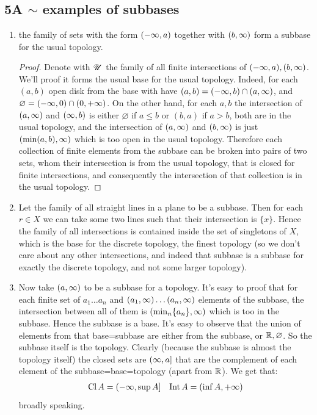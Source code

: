 \documentclass[a4paper]{article}
\newcommand\nsubsection[1]{\subsection*{#1}\addcontentsline{toc}{subsection}{#1}}
\begin{document}
	\section[Bases and Subbases]{}
	\nsubsection{5A $\sim$ examples of subbases}
	\begin{enumerate}
		\item the family of sets with the form $(-\infty, a)$ together with $(b, \infty)$ form a subbase for the usual topology. 
		\begin{proof}
			Denote with $\mathscr{U}$ the family of all finite intersections of $(-\infty, a), (b, \infty)$. We'll proof it forms the usual base for the usual topology. Indeed, for each $(a, b)$ open disk from the base with have $(a, b) = (-\infty, b) \cap (a, \infty)$, and $\varnothing = (-\infty, 0) \cap (0, + \infty)$. On the other hand, for each $a, b$ the intersection of $(a, \infty)$ and $(\infty, b)$ is either $\varnothing$ if $a \le b$ or $(b, a)$ if $a > b$, both are in the usual topology, and the intersection of $(a, \infty)$ and $(b, \infty)$ is just $(\min(a, b), \infty)$ which is too open in the usual topology. Therefore each collection of finite elements from the subbase can be broken into pairs of two sets, whom their intersection is from the usual topology, that is closed for finite intersections, and consequently the intersection of that collection is in the usual topology.  
		\end{proof}
		\item Let the family of all straight lines in a plane to be a subbase. Then for each $r \in X$ we can take some two lines such that their intersection is $\{x\}$. Hence the family of all intersections is contained inside the set of singletons of $X$, which is the base for the discrete topology, the finest topology (so we don't care about any other intersections, and indeed that subbase is a subbase for exactly the discrete topology, and not some larger topology). 
		\item Now take $(a, \infty)$ to be a subbase for a topology. It's easy to proof that for each finite set of $a_1 \dots a_n$ and $(a_1, \infty) \dots (a_n, \infty)$ elements of the subbase, the intersection between all of them is $(\min_n\{a_n\}, \infty)$ which is too in the subbase. Hence the subbase is a base. It's easy to observe that the union of elements from that base=subbase are either from the subbase, or $\mathbb{R}, \varnothing$. So the subbase itself is the topology. Clearly (because the subbase is almost the topology itself) the closed sets are $(\infty, a]$ that are the complement of each element of the subbase=base=topology (apart from $\mathbb{R}$). We get that: 
		\begin{align*}
			\operatorname{Cl} A = (-\infty, \sup A] && \operatorname{Int} A = (\inf A, +\infty)
		\end{align*}
		broadly speaking. 
	\end{enumerate}
	
\end{document}
